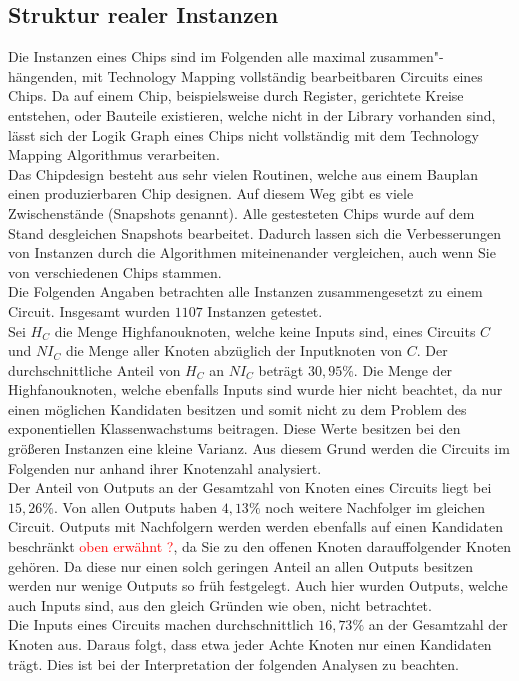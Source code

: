 \documentclass[11pt, a4paper, german]{article}
\newcommand{\TM}{Technology Mapping }
\begin{document}
 \subsection{Struktur realer Instanzen}
\label{subsec:struktur_realer_instanzen} 
 Die Instanzen eines Chips sind im Folgenden alle maximal zusammen"-h\"angen\-den, mit \TM vollständig bearbeitbaren Circuits eines Chips. Da auf einem Chip, beispielsweise durch Register, gerichtete Kreise entstehen, oder Bauteile existieren, welche nicht in der Library vorhanden sind, lässt sich der Logik Graph eines Chips nicht vollständig mit dem \TM Algorithmus verarbeiten. \\
 Das Chipdesign besteht aus sehr vielen Routinen, welche aus einem Bauplan einen produzierbaren Chip designen. Auf diesem Weg gibt es viele Zwischenstände (Snapshots genannt). Alle gestesteten Chips wurde auf dem Stand  desgleichen Snapshots bearbeitet. Dadurch lassen sich die Verbesserungen von Instanzen durch die Algorithmen miteinenander vergleichen, auch wenn Sie von verschiedenen Chips stammen.\\
 Die Folgenden Angaben betrachten alle Instanzen zusammengesetzt zu einem Circuit.
 Insgesamt wurden $1107$ Instanzen getestet. \\
 Sei $H_C$ die Menge Highfanouknoten, welche keine Inputs sind, eines Circuits $C$ und $NI_C$ die Menge aller Knoten abz\"uglich der Inputknoten von $C$. Der durchschnittliche Anteil von $H_C$ an $NI_C$ betr\"agt $30,95\%$. Die Menge der Highfanouknoten, welche ebenfalls Inputs sind wurde hier nicht beachtet, da nur einen m\"oglichen Kandidaten besitzen und somit nicht zu dem Problem des exponentiellen Klassenwachstums beitragen. Diese Werte besitzen bei den gr\"o{\ss}eren Instanzen eine kleine Varianz. Aus diesem Grund werden die Circuits im Folgenden nur anhand ihrer Knotenzahl analysiert.\\
 Der Anteil von Outputs an der Gesamtzahl von Knoten eines Circuits liegt bei $15,26\%$. Von allen Outputs haben $4,13\%$ noch weitere Nachfolger im gleichen Circuit. Outputs mit Nachfolgern werden werden ebenfalls auf einen Kandidaten beschr\"ankt \textcolor{red}{oben erw\"ahnt ?}, da Sie zu den offenen Knoten darauffolgender Knoten gehören. Da diese nur einen solch geringen Anteil an allen Outputs besitzen werden nur wenige Outputs so fr\"uh festgelegt. Auch hier wurden Outputs, welche auch Inputs sind, aus den gleich Gr\"unden wie oben, nicht betrachtet.\\
 Die Inputs eines Circuits machen durchschnittlich $16,73\%$ an der Gesamtzahl der Knoten aus. Daraus folgt, dass etwa jeder Achte Knoten nur einen Kandidaten tr\"agt. Dies ist bei der Interpretation der folgenden Analysen zu beachten.\\
\end{document}
